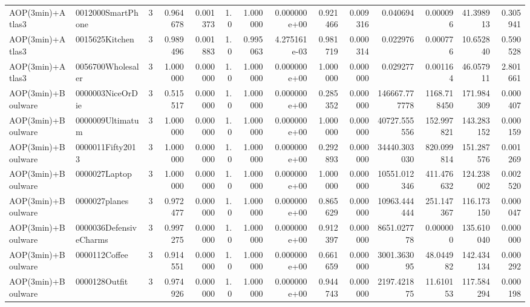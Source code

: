 \begin{tabular}{llrr|r|rr|rr|rr|rrr}
         AOP(3min)+Atlas3 &      0012000SmartPhone &       3 & 0.964678 & 0.001373 &  1.0 &      1.000000 & 0.000000e+00 &      0.921466 & 0.009316 &      0.040694 &    0.000096 &    41.398913 &    0.305941 \\
         AOP(3min)+Atlas3 &         0015625Kitchen &       3 & 0.989496 & 0.001883 &  1.0 &      0.995063 & 4.275161e-03 &      0.981719 & 0.000314 &      0.022976 &    0.000776 &    10.652840 &    0.590528 \\
         AOP(3min)+Atlas3 &      0056700Wholesaler &       3 & 1.000000 & 0.000000 &  1.0 &      1.000000 & 0.000000e+00 &      1.000000 & 0.000000 &      0.029277 &    0.001164 &    46.057911 &    2.801661 \\
       AOP(3min)+Boulware &       0000003NiceOrDie &       3 & 0.515517 & 0.000000 &  1.0 &      1.000000 & 0.000000e+00 &      0.285352 & 0.000000 & 146667.777778 & 1168.718450 &   171.984309 &    0.000407 \\
       AOP(3min)+Boulware &       0000009Ultimatum &       3 & 1.000000 & 0.000000 &  1.0 &      1.000000 & 0.000000e+00 &      1.000000 & 0.000000 &  40727.555556 &  152.997821 &   143.283152 &    0.000159 \\
       AOP(3min)+Boulware &       0000011Fifty2013 &       3 & 1.000000 & 0.000000 &  1.0 &      1.000000 & 0.000000e+00 &      0.292893 & 0.000000 &  34440.303030 &  820.099814 &   151.287576 &    0.001269 \\
       AOP(3min)+Boulware &          0000027Laptop &       3 & 1.000000 & 0.000000 &  1.0 &      1.000000 & 0.000000e+00 &      1.000000 & 0.000000 &  10551.012346 &  411.476632 &   124.238002 &    0.002520 \\
       AOP(3min)+Boulware &          0000027planes &       3 & 0.972477 & 0.000000 &  1.0 &      1.000000 & 0.000000e+00 &      0.865629 & 0.000000 &  10963.444444 &  251.147367 &   116.173150 &    0.000047 \\
       AOP(3min)+Boulware & 0000036DefensiveCharms &       3 & 0.997275 & 0.000000 &  1.0 &      1.000000 & 0.000000e+00 &      0.912397 & 0.000000 &   8651.027778 &    0.000000 &   135.610040 &    0.000000 \\
       AOP(3min)+Boulware &          0000112Coffee &       3 & 0.914551 & 0.000000 &  1.0 &      1.000000 & 0.000000e+00 &      0.661659 & 0.000000 &   3001.363095 &   48.044982 &   142.434134 &    0.000292 \\
       AOP(3min)+Boulware &          0000128Outfit &       3 & 0.974926 & 0.000000 &  1.0 &      1.000000 & 0.000000e+00 &      0.944743 & 0.000000 &   2197.421875 &   11.610153 &   117.584294 &    0.000198 \\

\end{tabular}
